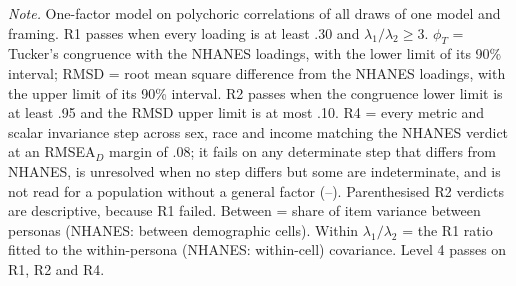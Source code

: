 \begin{table}[tp]
\begin{tabnote}
\textit{Note.} One-factor model on polychoric correlations of all draws of one model and framing. R1 passes when every loading is at least .30 and $\lambda_1/\lambda_2 \ge 3$. $\phi_T$ = Tucker's congruence with the NHANES loadings, with the lower limit of its 90\% interval; RMSD = root mean square difference from the NHANES loadings, with the upper limit of its 90\% interval. R2 passes when the congruence lower limit is at least .95 and the RMSD upper limit is at most .10. R4 = every metric and scalar invariance step across sex, race and income matching the NHANES verdict at an RMSEA$_D$ margin of .08; it fails on any determinate step that differs from NHANES, is unresolved when no step differs but some are indeterminate, and is not read for a population without a general factor (--). Parenthesised R2 verdicts are descriptive, because R1 failed. Between = share of item variance between personas (NHANES: between demographic cells). Within $\lambda_1/\lambda_2$ = the R1 ratio fitted to the within-persona (NHANES: within-cell) covariance. Level 4 passes on R1, R2 and R4.
\end{tabnote}
\end{table}
